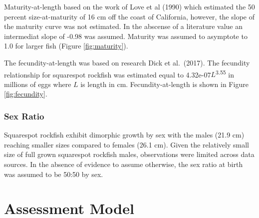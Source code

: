 \documentclass[11pt,
  english,
  a4paper,
]{article}
\begin{document}
Maturity-at-length based on the work of Love et al {(1990)\leavevmode\tagmcend\tagstructend} which estimated the 50 percent size-at-maturity of 16 cm off the coast of California, however, the slope of the maturity curve was not estimated. In the abscense of a literature value an intermediat slope of -0.98 was assumed. Maturity was assumed to asymptote to 1.0 for larger fish (Figure \ref{fig:maturity}).

\leavevmode\tagmcend\tagstructend\par


The fecundity-at-length was based on research Dick et al.~{(2017)\leavevmode\tagmcend\tagstructend}. The fecundity relationship for squarespot rockfish was estimated equal to 4.32e-07{\(L\)\leavevmode\tagmcend\tagstructend}\textsuperscript{3.55} in millions of eggs where {\(L\)\leavevmode\tagmcend\tagstructend} is length in cm. Fecundity-at-length is shown in Figure \ref{fig:fecundity}.

\leavevmode\tagmcend\tagstructend\par


\hypertarget{sex-ratio}{%
\subsubsection{Sex Ratio}\label{sex-ratio}}

\leavevmode\tagmcend\tagstructend


Squarespot rockfish exhibit dimorphic growth by sex with the males (21.9 cm) reaching smaller sizes compared to females (26.1 cm). Given the relatively small size of full grown squarespot rockfish males, observations were limited across data sources. In the absence of evidence to assume otherwise, the sex ratio at birth was assumed to be 50:50 by sex.

\leavevmode\tagmcend\tagstructend\par


\hypertarget{assessment-model}{%
\section{Assessment Model}\label{assessment-model}}
\end{document}
